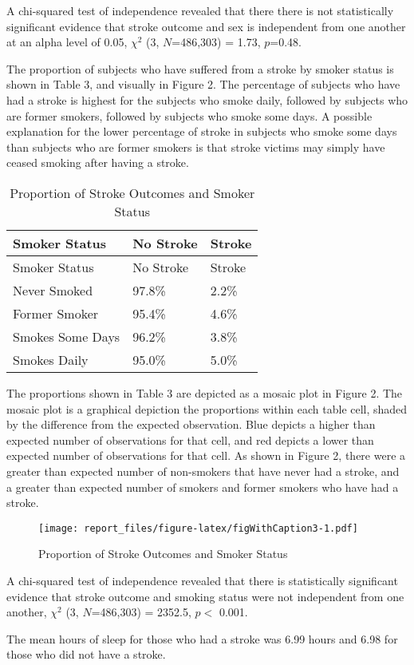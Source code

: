 \documentclass[11pt,]{article}
\begin{document}
A chi-squared test of independence revealed that there there is not
statistically significant evidence that stroke outcome and sex is
independent from one another at an alpha level of 0.05, \(\chi^2\) (3,
\(N\)=486,303) = 1.73, \(p\)=0.48.

The proportion of subjects who have suffered from a stroke by smoker
status is shown in Table 3, and visually in Figure 2. The percentage of
subjects who have had a stroke is highest for the subjects who smoke
daily, followed by subjects who are former smokers, followed by subjects
who smoke some days. A possible explanation for the lower percentage of
stroke in subjects who smoke some days than subjects who are former
smokers is that stroke victims may simply have ceased smoking after
having a stroke.

\begin{longtable}[]{@{}lll@{}}
\caption{Proportion of Stroke Outcomes and Smoker Status}\tabularnewline
\toprule
Smoker Status & No Stroke & Stroke\tabularnewline
\midrule
\endfirsthead
\toprule
Smoker Status & No Stroke & Stroke\tabularnewline
\midrule
\endhead
Never Smoked & 97.8\% & 2.2\%\tabularnewline
Former Smoker & 95.4\% & 4.6\%\tabularnewline
Smokes Some Days & 96.2\% & 3.8\%\tabularnewline
Smokes Daily & 95.0\% & 5.0\%\tabularnewline
\bottomrule
\end{longtable}

The proportions shown in Table 3 are depicted as a mosaic plot in Figure
2. The mosaic plot is a graphical depiction the proportions within each
table cell, shaded by the difference from the expected observation. Blue
depicts a higher than expected number of observations for that cell, and
red depicts a lower than expected number of observations for that cell.
As shown in Figure 2, there were a greater than expected number of
non-smokers that have never had a stroke, and a greater than expected
number of smokers and former smokers who have had a stroke.

\begin{figure}
\centering
\texttt{[image: report\_files/figure-latex/figWithCaption3-1.pdf]}
\caption{Proportion of Stroke Outcomes and Smoker Status}
\end{figure}

A chi-squared test of independence revealed that there is statistically
significant evidence that stroke outcome and smoking status were not
independent from one another, \(\chi^2\) (3, \(N\)=486,303) = 2352.5,
\(p <\) 0.001.

The mean hours of sleep for those who had a stroke was 6.99 hours and
6.98 for those who did not have a stroke.
\end{document}
